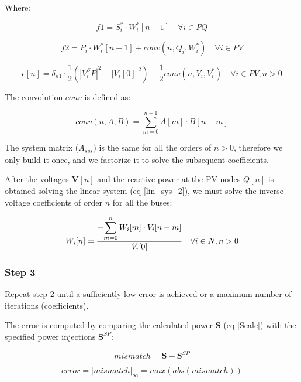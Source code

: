 \documentclass[11pt,fleqn]{book} %
\begin{document}
Where:

\begin{equation}
f1 = S^*_i \cdot W^*_i[n-1] \quad \forall i \in PQ
\end{equation}

\begin{equation}
f2 = P_i \cdot W^*_i[n-1] + conv(n, Q_i, W^*_i) \quad \forall i \in PV
\end{equation}

\begin{equation}
\epsilon[n] = \delta_{n1} \cdot \frac{1}{2} \left(|V_i^SP|^2 - |V_i[0]|^2\right) - \frac{1}{2} conv(n, V_i, V_i^*)  \quad \forall i \in PV, n > 0
\end{equation}

The convolution $conv$ is defined as:

\begin{equation}
conv(n, A, B) = \sum_{m=0}^{n-1} A[m] \cdot B[n-m]
\end{equation}

The system matrix ($A_{sys}$) is the same for all the orders of $n>0$, therefore we only build it once, and we factorize it to solve the subsequent coefficients.

After the voltages $\textbf{V}[n]$ and the reactive power at the PV nodes $Q[n]$ is obtained solving the linear system (eq \ref{lin_sys_2}), we must solve the inverse voltage coefficients of order $n$ for all the buses:

\begin{equation}
W_i[n] = \frac{- \mathlarger{\sum_{m=0}^{n}W_i[m] \cdot V_i[n-m]} }{V_i[0]} \quad  \forall i \in N, n>0
\end{equation}


\subsubsection{Step 3}

Repeat step 2 until a sufficiently low error is achieved or a maximum number of iterations (coefficients).


The error is computed by comparing the calculated power $\textbf{S}$ (eq \ref{Scalc}) with the specified power injections $\textbf{S}^{SP}$:

\begin{equation}
mismatch = \textbf{S} - \textbf{S}^{SP}
\end{equation}

\begin{equation}
error = |mismatch|_\infty = max(abs(mismatch))
\end{equation}
\end{document}
